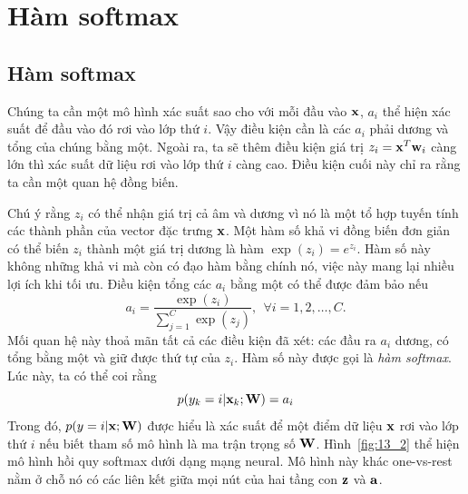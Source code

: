 \section{Hàm softmax}
\subsection{Hàm softmax}

Chúng ta cần một mô hình xác suất sao cho với mỗi đầu vào $\mathbf{x}$, $a_i$ thể hiện
xác suất để đầu vào đó rơi vào lớp thứ $i$. Vậy điều kiện cần là các $a_i$ phải
dương và tổng của chúng bằng một. Ngoài ra, ta sẽ thêm điều kiện giá trị $z_i =
\mathbf{x}^T\mathbf{w}_i$ càng lớn thì xác suất dữ liệu rơi vào lớp thứ $i$ càng cao. Điều
kiện cuối này chỉ ra rằng ta cần một quan hệ đồng biến.

Chú ý rằng $z_i$ có thể nhận giá trị cả âm và dương vì nó là một tổ hợp tuyến
tính các thành phần của vector đặc trưng $\mathbf{x}$. Một hàm số khả vi đồng biến đơn
giản có thể biến $z_i $ thành một giá trị dương là hàm $\exp(z_i) = e^{z_i}$.
Hàm số này không những khả vi mà còn có đạo hàm bằng chính nó, việc này mang
lại nhiều lợi ích khi tối ưu. Điều kiện tổng các $a_i$ bằng một có
thể được đảm bảo nếu \begin{equation} a_i = \frac{\exp(z_i)}{\sum_{j=1}^C
\exp(z_j)}, ~~ \forall i = 1, 2, \dots, C.
\end{equation}
Mối quan hệ này thoả mãn tất cả các điều kiện đã xét: các đầu ra $a_i$ dương, có
tổng bằng một và giữ được {thứ tự} của $z_i$. Hàm số này được gọi là
\textit{hàm softmax}. Lúc này, ta có thể coi rằng
\begin{equation}
p(y_k = i | \mathbf{x}_k; \mathbf{W}) = a_i
\end{equation}
Trong đó, $p(y = i | \mathbf{x}; \mathbf{W})$ được hiểu là xác suất để một điểm
dữ liệu $\mathbf{x}$ rơi vào lớp thứ $i$ nếu biết tham số mô hình là ma trận
trọng số $\mathbf{W}$.
Hình~\ref{fig:13_2} thể hiện mô hình hồi quy softmax dưới dạng mạng neural. Mô hình này khác one-vs-rest nằm ở chỗ nó có các liên kết giữa mọi nút của hai tầng con $\mathbf{z}$ và $\mathbf{a}$.



